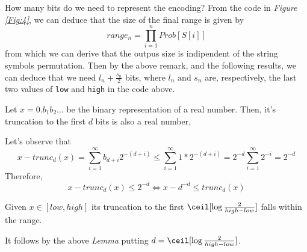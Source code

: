 \documentclass{subfiles}
\begin{document}
        How many bits do we need to represent the encoding? 
        From the code in \emph{Figure \ref{Fig:4}},
            we can deduce that the size of the final range is given by 
            \[
                range_{n} = \prod_{i = 1}^{n}{Prob[S[i]]}
            \]
            from which we can derive that the outpus size is indipendent of the 
            string symbols permutation.
        Then by the above remark, and the following results, 
            we can deduce that we need \(l_{n} + \tfrac{s_{n}}{2}\) bits,
            where \(l_{n} \text{ and } s_{n}\) are, respectively,
            the last two values of \lstinline{low} and \lstinline{high} in the code above.
        \begin{lemma*}
            Let \(x = 0.b_{1}b_{2}\ldots\) be the binary representation of a real number.
            Then, it's truncation to the first \(d\) bits is also a real number,
        \end{lemma*}
        \begin{proof*}
            Let's observe that 
            \[
                x - trunc_{d}(x) = \sum_{i = 1}^{\infty}{b_{d + i} 2^{-(d + i)}}
                \le \sum_{i = 1}^{\infty}{1 * 2^{-(d + i)}} 
                =2^{-d} \sum_{i = 1}^{\infty}{2^{-i}} = 2^{-d}
            \]
            Therefore, 
            \[
                x - trunc_{d}(x) \le 2^{-d} \iff x - d^{-d} \le trunc_{d}(x)
            \]
        \end{proof*}
        \begin{corollary*}
            Given \(x \in [low, high]\) its truncation to the first
            \(\ceil[\log \tfrac{2}{high - low}]\) falls within the range.
        \end{corollary*}
        \begin{proof*}
            It follows by the above \emph{Lemma} putting 
                \(d = \ceil[\log \tfrac{2}{high - low}]\).
        \end{proof*}
\end{document}
